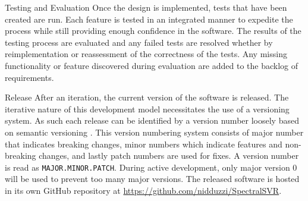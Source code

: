 \begin{numdesc}
      \item[Testing and Evaluation]
      Once the design is implemented, tests that have been created are run. Each feature is tested in an integrated manner to expedite the process while still providing enough confidence in the software. The results of the testing process are evaluated and any failed tests are resolved whether by reimplementation or reassessment of the correctness of the tests. Any missing functionality or feature discovered during evaluation are added to the backlog of requirements.

      \item[Release]
      After an iteration, the current version of the software is released. The iterative nature of this development model necessitates the use of a versioning system. As such each release can be identified by a version number loosely based on semantic versioning \autocite{preston-wernerSemanticVersioning2002023}. This version numbering system consists of major number that indicates breaking changes, minor numbers which indicate features and non-breaking changes, and lastly patch numbers are used for fixes. A version number is read as \verb|MAJOR.MINOR.PATCH|. During active development, only major version 0 will be used to prevent too many major versions. The released software is hosted in its own GitHub repository at \url{https://github.com/nidduzzi/SpectralSVR}.

\end{numdesc}


